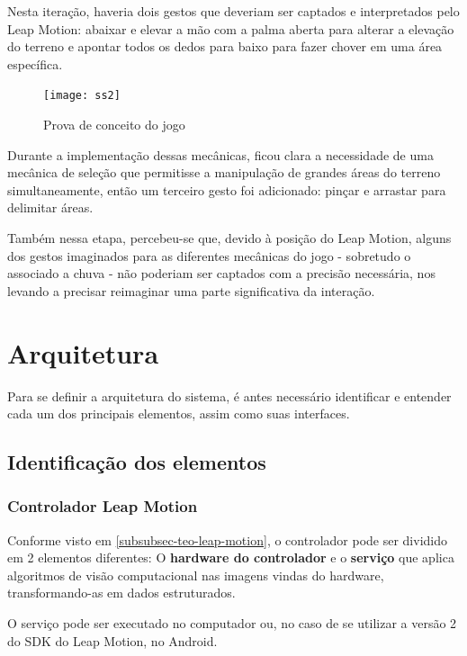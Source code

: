 Nesta iteração, haveria dois gestos que deveriam ser captados e interpretados pelo Leap Motion: abaixar e elevar a mão com a palma aberta para alterar a elevação do terreno e apontar todos os dedos para baixo para fazer chover em uma área específica.

\begin{figure}[h]
	\centering
	\texttt{[image: ss2]}
	\caption{Prova de conceito do jogo}
\end{figure}

Durante a implementação dessas mecânicas, ficou clara a necessidade de uma mecânica de seleção que permitisse a manipulação de grandes áreas do terreno simultaneamente, então um terceiro gesto foi adicionado: pinçar e arrastar para delimitar áreas.

Também nessa etapa, percebeu-se que, devido à posição do Leap Motion, alguns dos gestos imaginados para as diferentes mecânicas do jogo - sobretudo o associado a chuva - não poderiam ser captados com a precisão necessária, nos levando a precisar reimaginar uma parte significativa da interação.


\section{Arquitetura}\label{sec-desenvolvimento-arquitetura}

Para se definir a arquitetura do sistema, é antes necessário identificar e entender cada um dos principais elementos, assim como suas interfaces.

\subsection{Identificação dos elementos}\label{subsec-identificacao-elementos}

\subsubsection{Controlador Leap Motion}\label{subsubsec-elemento-leapmotion}

Conforme visto em \ref{subsubsec-teo-leap-motion}, o controlador pode ser dividido em 2 elementos diferentes: O \textbf{hardware do controlador} e o \textbf{serviço} que aplica algoritmos de visão computacional nas imagens vindas do hardware, transformando-as em dados estruturados.

O serviço pode ser executado no computador ou, no caso de se utilizar a versão 2 do SDK do Leap Motion, no Android.

